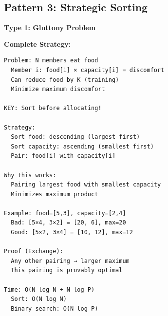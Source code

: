 \documentclass[11pt,a4paper,oneside]{book}
\begin{document}
\subsection{Pattern 3: Strategic Sorting}

\begin{tcolorbox}[
    enhanced,breakable,
    colback=warnyellow!10,
    colframe=warnyellow,
    boxrule=2pt,
    arc=4mm,
    title=\textbf{Complete Strategic Sorting Algorithms}
]
\textbf{Type 1: Gluttony Problem}

\textbf{Complete Strategy:}
\begin{verbatim}
Problem: N members eat food
  Member i: food[i] × capacity[i] = discomfort
  Can reduce food by K (training)
  Minimize maximum discomfort

KEY: Sort before allocating!

Strategy:
  Sort food: descending (largest first)
  Sort capacity: ascending (smallest first)
  Pair: food[i] with capacity[i]

Why this works:
  Pairing largest food with smallest capacity
  Minimizes maximum product

Example: food=[5,3], capacity=[2,4]
  Bad: [5×4, 3×2] = [20, 6], max=20
  Good: [5×2, 3×4] = [10, 12], max=12

Proof (Exchange):
  Any other pairing → larger maximum
  This pairing is provably optimal

Time: O(N log N + N log P)
  Sort: O(N log N)
  Binary search: O(N log P)
\end{verbatim}
\end{tcolorbox}
\end{document}
